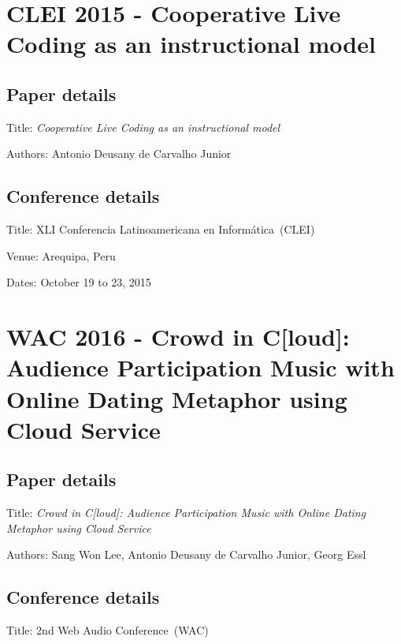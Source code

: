 \section{CLEI 2015 - Cooperative Live Coding as an instructional model}
\label{ape:paperclei2015}

\subsection*{Paper details}

Title: \textit{Cooperative Live Coding as an instructional model}

Authors: Antonio Deusany de Carvalho Junior

\subsection*{Conference details}

Title: XLI Conferencia Latinoamericana en Informática~(CLEI)

Venue: Arequipa, Peru

Dates: October 19 to 23, 2015




\section{WAC 2016 - Crowd in C[loud]: Audience Participation Music with Online Dating Metaphor using Cloud Service}
\label{ape:paperwac2016}

\subsection*{Paper details}

Title: \textit{Crowd in C[loud]: Audience Participation Music with Online Dating Metaphor using Cloud Service}

Authors: Sang Won Lee, Antonio Deusany de Carvalho Junior, Georg Essl

\subsection*{Conference details}

Title: 2nd Web Audio Conference~(WAC)

